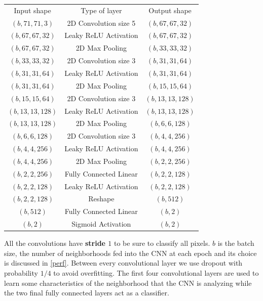 \documentclass[10pt,conference,compsocconf]{IEEEtran}
\begin{document}
\begin{center}
\begin{tabular}{c | c | c}
Input shape & Type of layer & Output shape \\ \hhline{===}
$(b, 71, 71, 3)$ & 2D Convolution size 5 & $(b, 67, 67, 32)$ \\
$(b, 67, 67, 32)$ & Leaky ReLU Activation & $(b, 67, 67, 32)$ \\
$(b, 67, 67, 32)$ & 2D Max Pooling & $(b, 33, 33, 32)$ \\ \hline

$(b, 33, 33, 32)$ & 2D Convolution size 3 & $(b, 31, 31, 64)$ \\
$(b, 31, 31, 64)$ & Leaky ReLU Activation  & $(b, 31, 31, 64)$ \\
$(b, 31, 31, 64)$ & 2D Max Pooling & $(b, 15, 15, 64)$ \\ \hline

$(b, 15, 15, 64)$ & 2D Convolution size 3 & $(b, 13, 13, 128)$ \\
$(b, 13, 13, 128)$ & Leaky ReLU Activation  & $(b, 13, 13, 128)$ \\
$(b, 13, 13, 128)$ & 2D Max Pooling & $(b, 6, 6, 128)$ \\ \hline

$(b, 6, 6, 128)$ & 2D Convolution size 3 & $(b, 4, 4, 256)$ \\
$(b, 4, 4, 256)$ & Leaky ReLU Activation  & $(b, 4, 4, 256)$ \\
$(b, 4, 4, 256)$ & 2D Max Pooling & $(b, 2, 2, 256)$ \\ \hline

$(b, 2, 2, 256)$ & Fully Connected Linear & $(b, 2, 2, 128)$ \\
$(b, 2, 2, 128)$ & Leaky ReLU Activation  & $(b, 2, 2, 128)$ \\ \hline

$(b, 2, 2, 128 )$ & Reshape & $(b, 512)$ \\ \hline
$(b, 512)$ & Fully Connected Linear & $(b, 2)$ \\
$(b, 2)$ & Sigmoid Activation & $(b, 2)$
\end{tabular}
\end{center}

All the convolutions have \textbf{stride $1$} to be sure to classify all pixels.
$b$ is the batch size, the number of neighborhoods fed into the CNN at each epoch and its choice is discussed in \ref{perf}.
Between every convolutional layer we use dropout with probability $1/4$ to avoid overfitting.
The first four convolutional layers are used to learn some characteristics of the neighborhood that the CNN is
analyzing while the two final fully connected layers act as a classifier.
\end{document}
